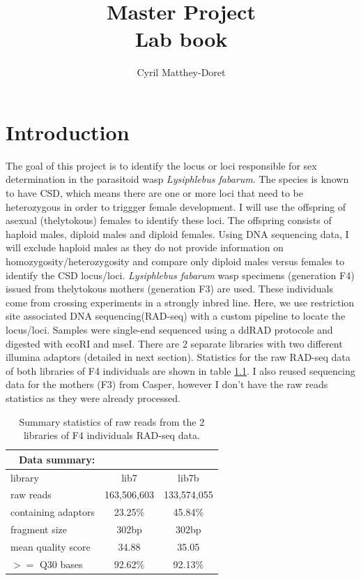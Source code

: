 \documentclass[10pt,a4paper]{report}
\author{Cyril Matthey-Doret}
\begin{document}
\title{\textbf{Master Project}\\ Lab book}
\maketitle
\chapter{Introduction}

The goal of this project is to identify the locus or loci responsible for sex determination in the parasitoid wasp \textit{Lysiphlebus fabarum}. The species is known to have CSD, which means there are one or more loci that need to be heterozygous in order to triggger female development. I will use the offspring of asexual (thelytokous) females to identify these loci. The offspring consists of haploid males, diploid males and diploid females. Using DNA sequencing data, I will exclude haploid males as they do not provide information on homozygosity/heterozygosity and compare only diploid males versus females to identify the CSD locus/loci.
\textit{Lysiphlebus fabarum} wasp specimens (generation F4) issued from thelytokous mothers (generation F3) are used. These individuals come from crossing experiments in a strongly inbred line. Here, we use restriction site associated DNA sequencing(RAD-seq) with a custom pipeline to locate the locus/loci. Samples were single-end sequenced using a ddRAD protocole and digested with ecoRI and mseI. There are 2 separate libraries with two different illumina adaptors (detailed in next section). Statistics for the raw RAD-seq data of both libraries of F4 individuals are shown in table \ref{table:raw_QC}. I also reused sequencing data for the mothers (F3) from Casper, however I don't have the raw reads statistics as they were already processed.

\begin{table}[h]
\begin{center}
\begin{tabular}{l| c c}
 \multicolumn{1}{r}{Data summary:} \\
 \hline
library & lib7 & lib7b \\
raw reads & 163,506,603 & 133,574,055 \\
containing adaptors & 23.25\% & 45.84\% \\
fragment size & 302bp & 302bp \\
mean quality score & 34.88 & 35.05 \\
$>=$ Q30 bases & 92.62\% & 92.13\% \\

\end{tabular}
\caption{Summary statistics of raw reads from the 2 libraries of F4 individuals RAD-seq data.}
\label{table:raw_QC}
\end{center}
\end{table}
\end{document}
